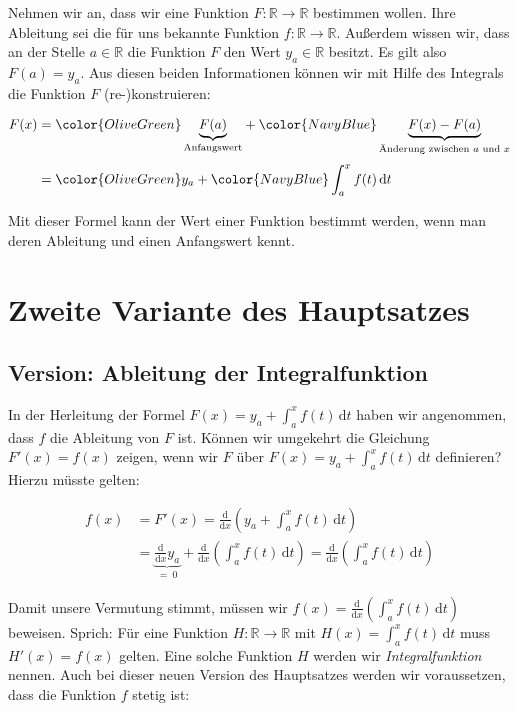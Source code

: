 \documentclass[fontsize=9pt,
               parskip=half-,
               DIV=14,
               listof=chapterentry,
               tocflat]{scrbook}
\begin{document}
Nehmen wir an, dass wir eine Funktion $F:\mathbb {R} \to \mathbb {R} $ bestimmen wollen. Ihre Ableitung sei die für uns bekannte Funktion $f:\mathbb {R} \to \mathbb {R} $. Außerdem wissen wir, dass an der Stelle $a\in \mathbb {R} $ die Funktion $F$ den Wert $y_{a}\in \mathbb {R} $ besitzt. Es gilt also $F(a)=y_{a}$. Aus diesen beiden Informationen können wir mit Hilfe des Integrals die Funktion $F$ (re-)konstruieren:

\begin{align*}
F(x)&={\color {OliveGreen}\underbrace {F(a)} _{\text{Anfangswert}}}+{\color {NavyBlue}\underbrace {F(x)-F(a)} _{{\text{Änderung zwischen }}a{\text{ und }}x}}\\[0.3em]&={\color {OliveGreen}y_{a}}+{\color {NavyBlue}\int _{a}^{x}f(t)\,\mathrm {d} t}
\end{align*}

Mit dieser Formel kann der Wert einer Funktion bestimmt werden, wenn man deren Ableitung und einen Anfangswert kennt.

\section{Zweite Variante des Hauptsatzes}

\subsection{Version: Ableitung der Integralfunktion}

In der Herleitung der Formel $F(x)=y_{a}+\int _{a}^{x}f(t)\,\mathrm {d} t$ haben wir angenommen, dass $f$ die Ableitung von $F$ ist. Können wir umgekehrt die Gleichung $F'(x)=f(x)$ zeigen, wenn wir $F$ über $F(x)=y_{a}+\int _{a}^{x}f(t)\,\mathrm {d} t$ definieren? Hierzu müsste gelten:

\begin{align*}
f(x)&=F'(x)={\frac {\mathrm {d} }{\mathrm {d} x}}\left(y_{a}+\int _{a}^{x}f(t)\,\mathrm {d} t\right)\\[0.5em]&=\underbrace {{\frac {\mathrm {d} }{\mathrm {d} x}}y_{a}} _{=\ 0}+{\frac {\mathrm {d} }{\mathrm {d} x}}\left(\int _{a}^{x}f(t)\,\mathrm {d} t\right)={\frac {\mathrm {d} }{\mathrm {d} x}}\left(\int _{a}^{x}f(t)\,\mathrm {d} t\right)
\end{align*}

Damit unsere Vermutung stimmt, müssen wir $f(x)={\frac {\mathrm {d} }{\mathrm {d} x}}\left(\int _{a}^{x}f(t)\,\mathrm {d} t\right)$ beweisen. Sprich: Für eine Funktion $H:\mathbb {R} \to \mathbb {R} $ mit $H(x)=\int _{a}^{x}f(t)\,\mathrm {d} t$ muss $H'(x)=f(x)$ gelten. Eine solche Funktion $H$ werden wir \emph{Integralfunktion} nennen. Auch bei dieser neuen Version des Hauptsatzes werden wir voraussetzen, dass die Funktion $f$ stetig ist:
\end{document}
